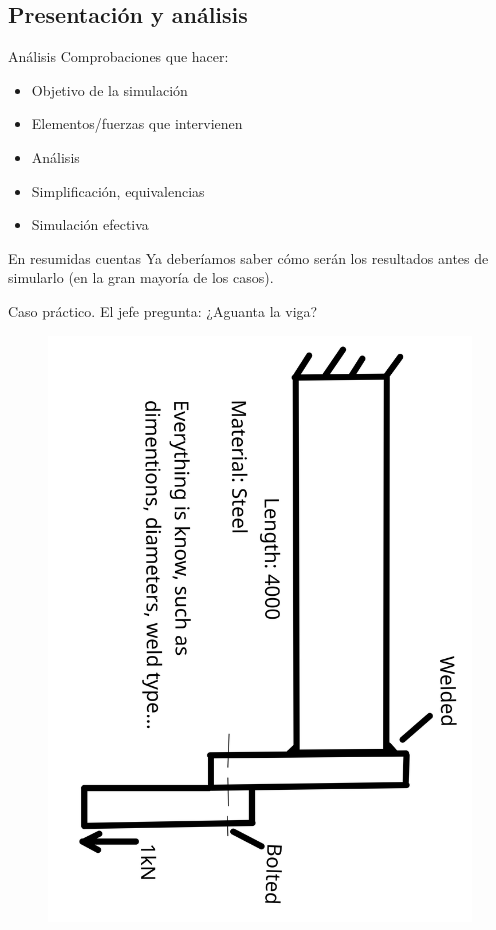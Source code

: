 \documentclass[12pt]{beamer}
\begin{document}
\subsection{Presentación y análisis}

\begin{frame}{Análisis}
	Comprobaciones que hacer:
	\begin{itemize}[label=$\checkmark$]
		\item Objetivo de la simulación
		\item Elementos/fuerzas que intervienen
		\item Análisis
		\item Simplificación, equivalencias
		\item Simulación efectiva
	\end{itemize}
	\begin{block}{En resumidas cuentas}
		Ya deberíamos saber cómo serán los resultados antes de simularlo (en la gran mayoría de los casos).
	\end{block}
\end{frame}

\begin{frame}{Caso práctico. El jefe pregunta: ¿Aguanta la viga?}
	\begin{figure}
		\centering
		\includegraphics[width=0.7\linewidth,angle=90]{case}
		\label{fig:case}
	\end{figure}
\end{frame}
\end{document}
